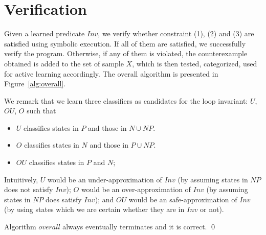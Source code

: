 
\section{Verification}
Given a learned predicate $Inv$, we verify whether constraint (1), (2) and (3) are satisfied using symbolic execution. 
If all of them are satisfied, we successfully verify the program. 
Otherwise, if any of them is violated, the counterexample obtained is added to the set of sample $X$,
 which is then tested, categorized, used for active learning accordingly. 
 The overall algorithm is presented in Figure~\ref{alg:overall}.

We remark that we learn three classifiers as candidates for the loop invariant: $U$, $OU$, $O$ such that
\begin{itemize}
\item $U$ classifies states in $P$ and those in $N \cup NP$.
\item $O$ classifies states in $N$ and those in $P \cup NP$.
\item $OU$ classifies states in $P$ and $N$;
\end{itemize}
Intuitively, $U$ would be an under-approximation of $Inv$ (by assuming states in $NP$ does not satisfy $Inv$); 
$O$ would be an over-approximation of $Inv$ (by assuming states in $NP$ does satisfy $Inv$); 
and $OU$ would be an safe-approximation of $Inv$ (by using states which we are certain whether they are in $Inv$ or not).
\begin{example}
\end{example}


\begin{theorem}
Algorithm $overall$ always eventually terminates and it is correct. \hfill \qed
\end{theorem}
